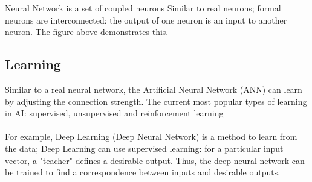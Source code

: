 Neural Network is a set of coupled neurons Similar to real neurons; formal neurons are interconnected: the output of one neuron is an input to another neuron. The figure above demonstrates this.
\subsection{Learning}
Similar to a real neural network, the Artificial Neural Network (ANN) can learn by adjusting the connection strength. The current most popular types of learning in AI: supervised, unsupervised and reinforcement learning 
\\\\
For example, Deep Learning (Deep Neural Network) is a method to learn from the data; Deep Learning can use supervised learning: for a particular input vector, a "teacher" defines a desirable output. Thus, the deep neural network can be trained to find a correspondence between inputs and desirable outputs. 
 

